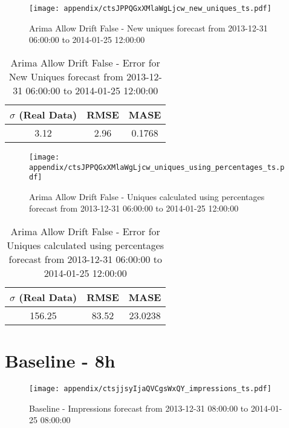\begin{figure}[H] \begin{center} \leavevmode
\texttt{[image: appendix/ctsJPPQGxXMlaWgLjcw\_new\_uniques\_ts.pdf]} \caption{
Arima Allow Drift False - New uniques forecast from 2013-12-31 06:00:00 to 2014-01-25 12:00:00} \label{fig:appendix/ctsJPPQGxXMlaWgLjcw_new_uniques_ts.pdf} \end{center}
\end{figure}

\begin{table}[H]
\centering
\footnotesize
\begin{tabular}{ccc}
$\sigma$ (Real Data) & RMSE & MASE   \\ \hline
3.12 & 2.96 & 0.1768 \\
\end{tabular}

\vspace{0.5cm}

\caption{
Arima Allow Drift False - Error for New Uniques forecast from 2013-12-31 06:00:00 to 2014-01-25 12:00:00}
\end{table}

\begin{figure}[H] \begin{center} \leavevmode
\texttt{[image: appendix/ctsJPPQGxXMlaWgLjcw\_uniques\_using\_percentages\_ts.pdf]} \caption{
Arima Allow Drift False - Uniques calculated using percentages forecast from 2013-12-31 06:00:00 to 2014-01-25 12:00:00} \label{fig:appendix/ctsJPPQGxXMlaWgLjcw_uniques_using_percentages_ts.pdf} \end{center}
\end{figure}

\begin{table}[H]
\centering
\footnotesize
\begin{tabular}{ccc}
$\sigma$ (Real Data) & RMSE & MASE   \\ \hline
156.25 & 83.52 & 23.0238 \\
\end{tabular}

\vspace{0.5cm}

\caption{
Arima Allow Drift False - Error for Uniques calculated using percentages forecast from 2013-12-31 06:00:00 to 2014-01-25 12:00:00}
\end{table}

\section{Baseline - 8h}
\begin{figure}[H] \begin{center} \leavevmode
\texttt{[image: appendix/ctsjjsyIjaQVCgsWxQY\_impressions\_ts.pdf]} \caption{
Baseline - Impressions forecast from 2013-12-31 08:00:00 to 2014-01-25 08:00:00} \label{fig:appendix/ctsjjsyIjaQVCgsWxQY_impressions_ts.pdf} \end{center}
\end{figure}

